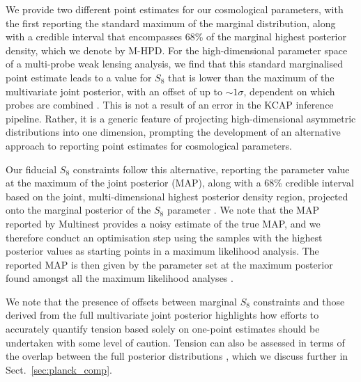 We provide two different point estimates for our cosmological parameters, with the first reporting the standard maximum of the marginal distribution, 
along with a credible interval that encompasses 68\% of the marginal highest posterior density, which we denote by M-HPD.  
For the high-dimensional parameter space of a multi-probe weak lensing analysis, we find that this standard marginalised point estimate leads to a value for $S_8$ that is lower than the 
maximum of the multivariate joint posterior, with an offset of up to $\sim 1 \sigma$, dependent on which probes are combined \citep[see section 7 of][]{joachimi/etal:inprep}.
This is not a result of an error in the {\sc KCAP} inference pipeline. 
Rather, it is a generic feature of projecting high-dimensional asymmetric distributions into one dimension, prompting the development of an alternative approach to reporting point estimates for cosmological parameters.

Our fiducial $S_8$ constraints follow this alternative, reporting the parameter value at the maximum of the joint posterior (MAP), along with a 68\% credible interval based on the joint, multi-dimensional highest posterior density region, projected onto the marginal posterior of the $S_8$ parameter \citep[see section 6.4 of][for further details on this MAP with PJ-HPD credible intervals]{joachimi/etal:inprep}.   We note that the MAP reported by {\sc Multinest} provides a noisy estimate of the true MAP, and we therefore conduct an optimisation step using the  samples with the highest posterior values as starting points in a \citet{nelder/mead:1965} maximum likelihood analysis.  The reported MAP is then given by the parameter set at the maximum posterior found amongst all the  maximum likelihood analyses \citep[see also][who adopt a similar approach]{muir/etal:2020}. 

We note that the presence of offsets between marginal $S_8$ constraints and those derived from the full multivariate joint posterior 
highlights how efforts to accurately quantify tension based solely on one-point estimates should be undertaken with some level of caution.  
Tension can also be assessed in terms of the overlap between the full posterior distributions \citep[see for example][]{handley/lemos:2019,lemos/etal:2019,Raveri2019}, which we discuss further in Sect.~\ref{sec:planck_comp}.







